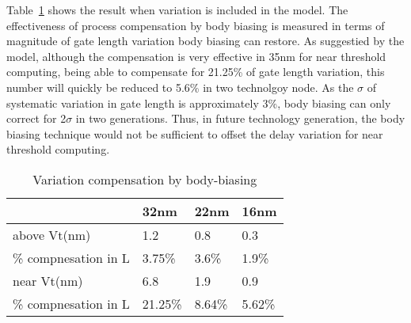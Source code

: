 Table~\ref{compensation} shows the result when variation is included in the model. The effectiveness of process compensation by body biasing is measured in terms of magnitude of gate length variation body biasing can restore. As suggestied by the model, although the compensation is very effective in 35nm for near threshold computing, being able to compensate for 21.25\% of gate length variation, this number will quickly be reduced to 5.6\% in two technolgoy node. As the $\sigma$ of systematic variation in gate length is approximately 3\%, body biasing can only correct for 2$\sigma$ in two generations. Thus, in future technology generation, the body biasing technique would not be sufficient to offset the delay variation for near threshold computing.    

\begin{table}
  \caption {Variation compensation by body-biasing}  
  \centering
  \label {compensation}
  \begin{tabular}{ | l | l | l | l | }
    \hline
    & 32nm & 22nm & 16nm \\ \hline
    above Vt(nm) & 1.2 & 0.8 & 0.3 \\ \hline
    \% compnesation in L  & 3.75\% & 3.6\% & 1.9\% \\ \hline
    near Vt(nm)  & 6.8 & 1.9 & 0.9\\  \hline
    \% compnesation in L & 21.25\% & 8.64\% & 5.62\% \\ 
    \hline
  \end{tabular}
\end{table}

